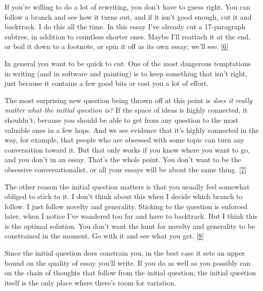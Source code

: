 If you're willing to do a lot of rewriting, you
                  don't have to guess right. You can follow a branch and see how
                  it turns out, and if it isn't good enough, cut it and
                  backtrack. I do this all the time. In this essay I've already
                  cut a 17-paragraph subtree, in addition to countless shorter
                  ones. Maybe I'll reattach it at the end, or boil it down to a
                  footnote, or spin it off as its own essay; we'll see.
                  [\href{\#f6n}{6}]

In general you want to be quick to cut. One of
                  the most dangerous temptations in writing (and in software and
                  painting) is to keep something that isn't right, just because
                  it contains a few good bits or cost you a lot of effort.

The
                  most surprising new question being thrown off at this point is
                  \emph{does it really matter what the initial question is?} If
                  the space of ideas is highly connected, it shouldn't, because
                  you should be able to get from any question to the most
                  valuable ones in a few hops. And we see evidence that it's
                  highly connected in the way, for example, that people who are
                  obsessed with some topic can turn any conversation toward it.
                  But that only works if you know where you want to go, and you
                  don't in an essay. That's the whole point. You don't want to
                  be the obsessive conversationalist, or all your essays will be
                  about the same thing.
                  [\href{\#f7n}{7}]

The other reason the initial question matters is
                  that you usually feel somewhat obliged to stick to it. I don't
                  think about this when I decide which branch to follow. I just
                  follow novelty and generality. Sticking to the question is
                  enforced later, when I notice I've wandered too far and have
                  to backtrack. But I think this is the optimal solution. You
                  don't want the hunt for novelty and generality to be
                  constrained in the moment. Go with it and see what you get.
                  [\href{\#f8n}{8}]

Since the initial question does constrain you, in
                  the best case it sets an upper bound on the quality of essay
                  you'll write. If you do as well as you possibly can on the
                  chain of thoughts that follow from the initial question, the
                  initial question itself is the only place where there's room
                  for variation.

